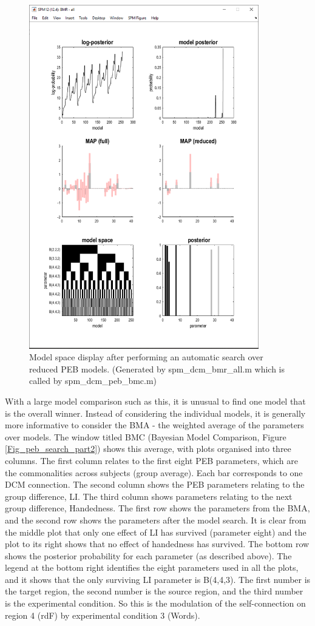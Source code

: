 \documentclass{article}
\begin{document}
\begin{figure}[ht]
\begin{center}
\includegraphics[width=10cm]{"Fig_peb_search_part1"}
\caption{Model space display after performing an automatic search over reduced PEB models. (Generated by spm\_dcm\_bmr\_all.m which is called by spm\_dcm\_peb\_bmc.m) \label{Fig_peb_search_part1}}
\end{center}
\end{figure}

With a large model comparison such as this, it is unusual to find one model that is the overall winner. Instead of considering the individual models, it is generally more informative to consider the BMA - the weighted average of the parameters over models. The window titled BMC (Bayesian Model Comparison, Figure \ref{Fig_peb_search_part2}) shows this average, with plots organised into three columns. The first column relates to the first eight PEB parameters, which are the commonalities across subjects (group average). Each bar corresponds to one DCM connection. The second column shows the PEB parameters relating to the group difference, LI. The third column shows parameters relating to the next group difference, Handedness. The first row shows the parameters from the BMA, and the second row shows the parameters after the model search. It is clear from the middle plot that only one effect of LI has survived (parameter eight) and the plot to its right shows that no effect of handedness has survived. The bottom row shows the posterior probability for each parameter (as described above). The legend at the bottom right identifies the eight parameters used in all the plots, and it shows that the only surviving LI parameter is B(4,4,3). The first number is the target region, the second number is the source region, and the third number is the experimental condition. So this is the modulation of the self-connection on region 4 (rdF) by experimental condition 3 (Words).
\end{document}
